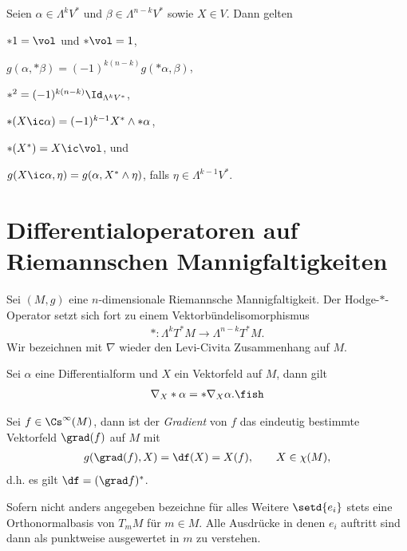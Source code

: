 \documentclass[%
	paper=a5,%
	fleqn,%
	DIV=18,%
	BCOR=0mm,
	fontsize=11pt,
	titlepage=false,%
	bibliography=totoc,
	DIV=18,%
	twoside=true,
	pdftitle=Riemannsche Geometrie,
	pdfauthor=Uwe Semmelmann,
	numbers=noendperiod]%
	{scrbook}
\begin{document}
\begin{lem}
Seien $\alpha\in\Lambda^k V^*$ und $\beta\in \Lambda^{n-k}V^*$ sowie $X\in V$. Dann gelten
\begin{propenum}
\item $*1 = \vol$ und $*\vol = 1$,
\item $g(\alpha,*\beta) = (-1)^{k(n-k)}g(*\alpha,\beta)$,
\item $*^2 = (-1)^{k(n-k)}\Id_{\Lambda^kV^*}$,
\item $*(X\ic \alpha) = (-1)^{k-1}X^*\wedge *\alpha$,
\item $*(X^*) = X\ic \vol$, und
\item $g(X\ic \alpha,\eta) = g(\alpha, X^*\wedge \eta)$, falls $\eta\in \Lambda^{k-1}V^*$.\fish
\end{propenum}
\end{lem}

\section{Differentialoperatoren auf Riemannschen Mannigfaltigkeiten}

Sei $(M,g)$ eine $n$-dimensionale Riemannsche Mannigfaltigkeit. Der Hodge-$*$-Operator setzt sich fort zu einem Vektorbündelisomorphismus
\begin{align*}
* : \Lambda^k T^*M\to \Lambda^{n-k}T^*M.
\end{align*}
Wir bezeichnen mit $\nabla$ wieder den Levi-Civita Zusammenhang auf $M$.

\begin{lem}
Sei $\alpha$ eine Differentialform und $X$ ein Vektorfeld auf $M$, dann gilt
\begin{align*}
\nabla_{X}*\alpha = * \nabla_{X}\alpha.\fish
\end{align*}
\end{lem}

\begin{defn}
Sei $f\in\Cs^\infty(M)$, dann ist der \emph{Gradient} von $f$ das eindeutig bestimmte Vektorfeld $\grad(f)$ auf $M$ mit
\begin{align*}
g(\grad(f),X) = \df(X) = X(f),\qquad X\in\chi(M),
\end{align*}
d.h. es gilt $\df = (\grad f)^*$.\fish
\end{defn}

\begin{rem}[Vereinbarung.]
Sofern nicht anders angegeben bezeichne für alles Weitere $\setd{e_{i}}$ stets eine Orthonormalbasis von $T_{m}M$ für $m\in M$. Alle Ausdrücke in denen $e_{i}$ auftritt sind dann als punktweise ausgewertet in $m$ zu verstehen.\map
\end{rem}
\end{document}
